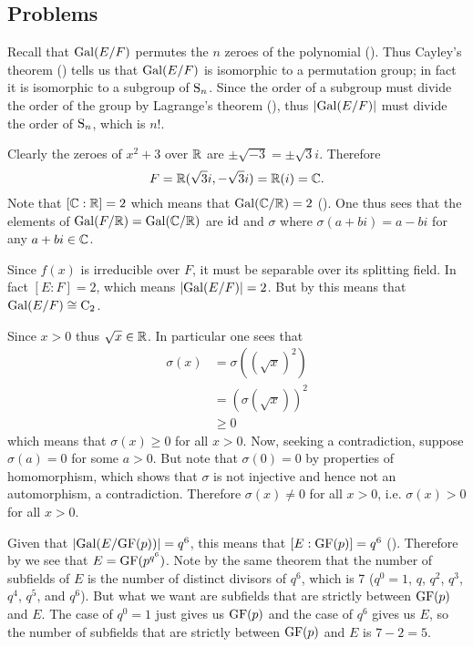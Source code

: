 \subsection*{Problems}
\begin{questions}
    \item Recall that $\mathrm{Gal}(E/F)$ permutes the $n$ zeroes of the polynomial (). Thus Cayley's theorem () tells us that $\mathrm{Gal}(E/F)$ is isomorphic to a permutation group; in fact it is isomorphic to a subgroup of $\mathrm{S}_{n}$. Since the order of a subgroup must divide the order of the group by Lagrange's theorem (), thus $|\mathrm{Gal}(E/F)|$ must divide the order of $\mathrm{S}_{n}$, which is $n!$.

    \item Clearly the zeroes of $x^2 + 3$ over $\mathbb{R}$ are $\pm\sqrt{-3} = \pm\sqrt3i$. Therefore
    \[
        F = \mathbb{R}(\sqrt3i, -\sqrt3i) = \mathbb{R}(i) = \mathbb{C}.
    \]
    Note that $[\mathbb{C}:\mathbb{R}] = 2$ which means that $\mathrm{Gal}(\mathbb{C}/\mathbb{R}) = 2$ (). One thus sees that the elements of $\mathrm{Gal}(F/\mathbb{R}) = \mathrm{Gal}(\mathbb{C}/\mathbb{R})$ are $\mathrm{id}$ and $\sigma$ where $\sigma(a + bi) = a - bi$ for any $a + bi \in \mathbb{C}$.

    \item Since $f(x)$ is irreducible over $F$, it must be separable over its splitting field. In fact $[E:F] = 2$, which means $|\mathrm{Gal}(E/F)| = 2$. But by  this means that $\mathrm{Gal}(E/F) \cong \mathrm{C}_{2}$.

    \item Since $x > 0$ thus $\sqrt x \in \mathbb{R}$. In particular one sees that
    \begin{align*}
        \sigma(x) &= \sigma\left((\sqrt x)^2\right)\\
        &= \left(\sigma(\sqrt x)\right)^2\\
        &\geq 0
    \end{align*}
    which means that $\sigma(x) \geq 0$ for all $x > 0$. Now, seeking a contradiction, suppose $\sigma(a) = 0$ for some $a > 0$. But note that $\sigma(0) = 0$ by properties of homomorphism, which shows that $\sigma$ is not injective and hence not an automorphism, a contradiction. Therefore $\sigma(x) \neq 0$ for all $x > 0$, i.e. $\sigma(x) > 0$ for all $x > 0$.

    \item Given that $|\mathrm{Gal}(E/\mathrm{GF}(p))| = q^6$, this means that $[E:\mathrm{GF}(p)] = q^6$ (). Therefore by  we see that $E = \mathrm{GF}(p^{q^6})$. Note by the same theorem that the number of subfields of $E$ is the number of distinct divisors of $q^6$, which is 7 ($q^0 = 1$, $q$, $q^2$, $q^3$, $q^4$, $q^5$, and $q^6$). But what we want are subfields that are strictly between $\mathrm{GF}(p)$ and $E$. The case of $q^0 = 1$ just gives us $\mathrm{GF}(p)$ and the case of $q^6$ gives us $E$, so the number of subfields that are strictly between $\mathrm{GF}(p)$ and $E$ is $7 - 2 = 5$.


\end{questions}
